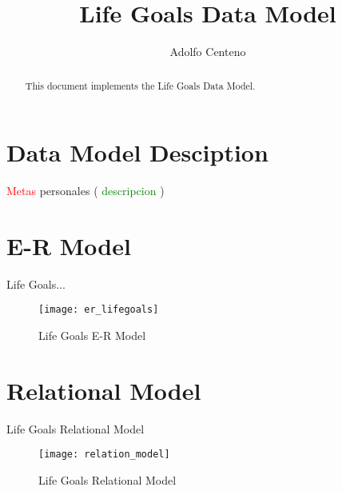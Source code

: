 \documentclass[10pt]{article}         %
\title{Life Goals Data Model}
\author{Adolfo Centeno}
\begin{document}
\maketitle

\begin{abstract}
This document implements the Life Goals Data Model.
\end{abstract}

\section{Data Model Desciption}


\textcolor{red}{Metas} personales ( \textcolor{green}{descripcion} )



\section{E-R Model}

Life Goals...

\begin{figure}[h]
     \texttt{[image: er\_lifegoals]}
     \caption{Life Goals E-R Model}
\end{figure}
   
\section{Relational Model}
Life Goals Relational Model

\begin{figure}[h]
     \texttt{[image: relation\_model]}
     \caption{Life Goals Relational Model}
\end{figure}
\end{document}
